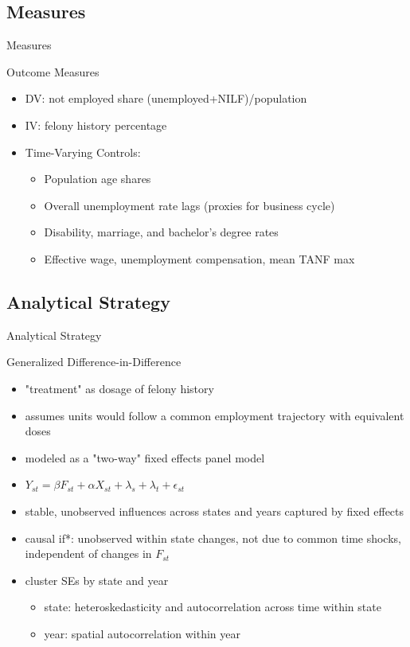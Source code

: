 \documentclass{beamer}\usepackage[]{graphicx}\usepackage[]{color}
\begin{document}
\subsection{Measures}

\begin{frame}{Measures}
\begin{block}{Outcome Measures}
\begin{itemize}

\item DV: not employed share (unemployed+NILF)/population 
\item IV: felony history percentage
\item Time-Varying Controls:
  \begin{itemize}
  \item Population age shares
  \item Overall unemployment rate lags (proxies for business cycle)
  \item Disability, marriage, and bachelor's degree rates
  \item Effective wage, unemployment compensation, mean TANF max
\end{itemize}

\end{itemize}
\end{block}
\end{frame}

\subsection{Analytical Strategy}


\begin{frame}{Analytical Strategy}
\begin{block}{Generalized Difference-in-Difference}
\begin{itemize}
\item "treatment" as dosage of felony history
\item assumes units would follow a common employment trajectory with equivalent doses
\item modeled as a "two-way" fixed effects panel model
\item $Y_{st} = \beta F_{st} + \alpha X_{st} + \lambda_s + \lambda_t + \epsilon_{st}$
\item stable, unobserved influences across states and years captured by fixed effects
\item causal if*: unobserved within state changes, not due to common time shocks, independent of changes in $F_{st}$
\item cluster SEs by state and year
  \begin{itemize}
  \item state: heteroskedasticity and autocorrelation across time within state
  \item year: spatial autocorrelation within year
  \end{itemize}

\end{itemize}
\end{block}
\end{frame}
\end{document}
